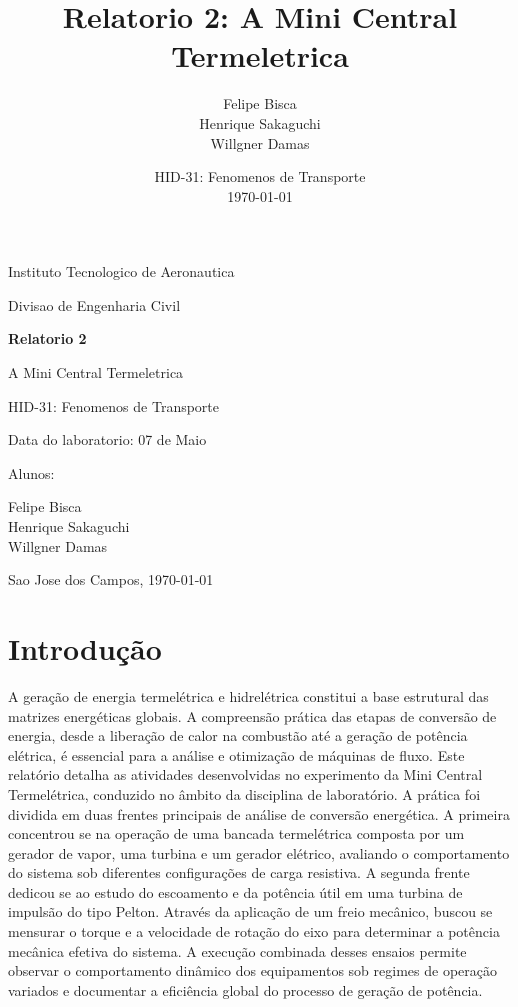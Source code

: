 \documentclass[12pt,a4paper]{article}
\title{Relatorio 2: A Mini Central Termeletrica}
\author{
Felipe Bisca \\
Henrique Sakaguchi \\
Willgner Damas
}
\date{HID-31: Fenomenos de Transporte\\\today}
\begin{document}
\begin{titlepage}
  \centering
  {\large Instituto Tecnologico de Aeronautica\par}
  {\large Divisao de Engenharia Civil\par}
  \vspace{2cm}
  {\Large\bfseries Relatorio 2\par}
  \vspace{0.4cm}
  {\Large A Mini Central Termeletrica\par}
  \vspace{2cm}
  {\large HID-31: Fenomenos de Transporte\par}
  {\large Data do laboratorio: 07 de Maio}
  \vfill
  {\large Alunos:\par}
   Felipe Bisca \\
    Henrique Sakaguchi \\
    Willgner Damas
  \vfill
  {\large Sao Jose dos Campos, \today\par}
\end{titlepage}

\tableofcontents
\newpage

\section{Introdução}

A geração de energia termelétrica e hidrelétrica constitui a base estrutural das matrizes energéticas globais. A compreensão prática das etapas de conversão de energia, desde a liberação de calor na combustão até a geração de potência elétrica, é essencial para a análise e otimização de máquinas de fluxo.
​Este relatório detalha as atividades desenvolvidas no experimento da Mini Central Termelétrica, conduzido no âmbito da disciplina de laboratório. A prática foi dividida em duas frentes principais de análise de conversão energética. A primeira concentrou se na operação de uma bancada termelétrica composta por um gerador de vapor, uma turbina e um gerador elétrico, avaliando o comportamento do sistema sob diferentes configurações de carga resistiva.
​A segunda frente dedicou se ao estudo do escoamento e da potência útil em uma turbina de impulsão do tipo Pelton. Através da aplicação de um freio mecânico, buscou se mensurar o torque e a velocidade de rotação do eixo para determinar a potência mecânica efetiva do sistema. A execução combinada desses ensaios permite observar o comportamento dinâmico dos equipamentos sob regimes de operação variados e documentar a eficiência global do processo de geração de potência.
\end{document}
